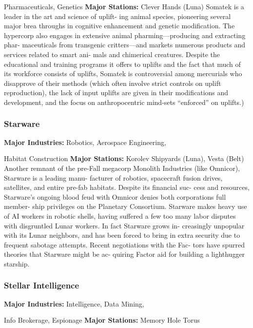 Pharmaceuticals, Genetics
\textbf{Major Stations:} Clever Hands (Luna)
Somatek is a leader in the art and science of uplift-
ing animal species, pioneering several major brea 
throughs in cognitive enhancement and genetic 
modification. The hypercorp also engages in extensive 
animal pharming—producing and extracting phar-
maceuticals from transgenic critters—and markets 
numerous products and services related to smart ani-
mals and chimerical creatures. Despite the educational 
and training programs it offers to uplifts and the fact 
that much of its workforce consists of uplifts, Somatek 
is controversial among mercurials who disapprove of 
their methods (which often involve strict controls on 
uplift reproduction), the lack of input uplifts are given 
in their modifications and development, and the focus 
on anthropocentric mind-sets ``enforced'' on uplifts.)

\subsubsection{Starware}

\textbf{Major Industries:} Robotics, Aerospace Engineering, 

Habitat Construction
\textbf{Major Stations:} Korolev Shipyards (Luna), Vesta (Belt)
Another remnant of the pre-Fall megacorp Monolith 
Industries (like Omnicor), Starware is a leading manu-
facturer of robotics, spacecraft fusion drives, satellites, 
and entire pre-fab habitats. Despite its financial suc-
cess and resources, Starware's ongoing blood feud 
with Omnicor denies both corporations full member-
ship privileges on the Planetary Consortium. Starware 
makes heavy use of AI workers in robotic shells, 
having suffered a few too many labor disputes with 
disgruntled Lunar workers. In fact Starware grows in-
creasingly unpopular with its Lunar neighbors, and has 
been forced to bring in extra security due to frequent 
sabotage attempts. Recent negotiations with the Fac-
tors have spurred theories that Starware might be ac-
quiring Factor aid for building a lighthugger starship.

\subsubsection{Stellar Intelligence}

\textbf{Major Industries:} Intelligence, Data Mining, 

Info Brokerage, Espionage
\textbf{Major Stations:} Memory Hole Torus 

